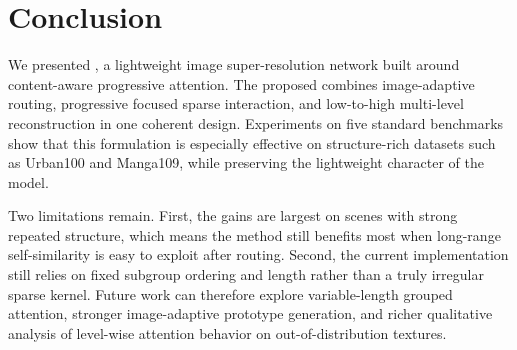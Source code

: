\section{Conclusion}
\label{sec:conclusion}

We presented \method{}, a lightweight image super-resolution network built around content-aware progressive attention. The proposed \moduleName{} combines image-adaptive routing, progressive focused sparse interaction, and low-to-high multi-level reconstruction in one coherent design. Experiments on five standard benchmarks show that this formulation is especially effective on structure-rich datasets such as Urban100 and Manga109, while preserving the lightweight character of the model.

Two limitations remain. First, the gains are largest on scenes with strong repeated structure, which means the method still benefits most when long-range self-similarity is easy to exploit after routing. Second, the current implementation still relies on fixed subgroup ordering and length rather than a truly irregular sparse kernel. Future work can therefore explore variable-length grouped attention, stronger image-adaptive prototype generation, and richer qualitative analysis of level-wise attention behavior on out-of-distribution textures.
